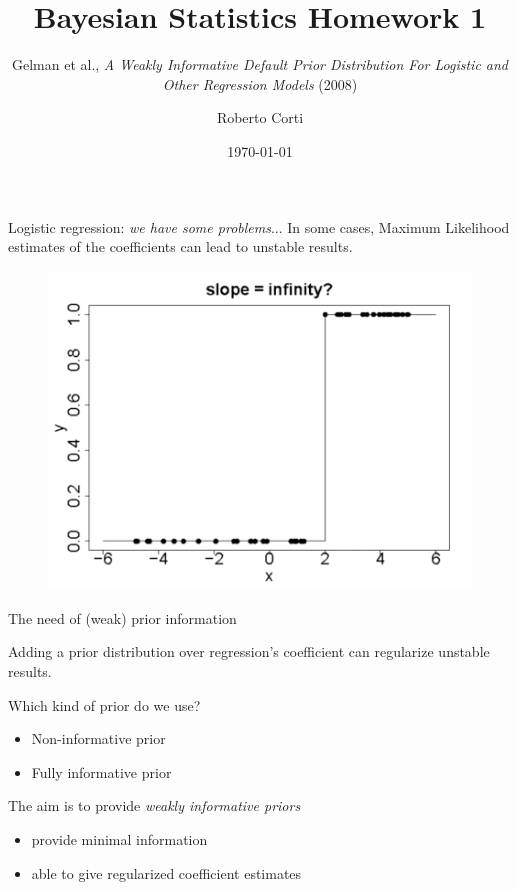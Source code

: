 \documentclass{beamer}
\title{Bayesian Statistics Homework 1}
\subtitle{Gelman et al., \textit{A Weakly Informative Default Prior Distribution For Logistic and Other Regression Models} (2008)}
\author{Roberto Corti}
\date{\today}
\begin{document}
	
	\frame{\titlepage}
	
	\begin{frame}{Logistic regression: \textit{we have some problems}... }
		In some cases, Maximum Likelihood estimates of the coefficients can lead to unstable results.
		
		\begin{figure}
			\includegraphics[scale=0.2]{imgs/separation.png}
		\end{figure}
		

		
	\end{frame}
	
\begin{frame}[t]{The need of (weak) prior information}
		
		Adding a prior distribution over regression's coefficient can regularize unstable results.
		\vspace{0.4cm}
		
		Which kind of prior do we use?
		
		\begin{itemize}
			\item Non-informative prior
			\item Fully informative prior
		\end{itemize}
	
		\vspace{0.3cm}
		The aim is to provide \textit{weakly informative priors}
		\begin{itemize}
			\item provide minimal information
			\item able to give regularized coefficient estimates
		\end{itemize}
	
\end{frame}
\end{document}

